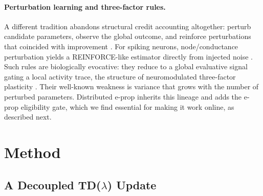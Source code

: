 \documentclass[10pt,twocolumn]{article}
\begin{document}
\paragraph{Perturbation learning and three-factor rules.}
A different tradition abandons structural credit accounting altogether:
perturb candidate parameters, observe the global outcome, and reinforce
perturbations that coincided with improvement
\citep{salimans2017evolutionstrategiesscalablealternative}. For spiking
neurons, node/conductance perturbation yields a REINFORCE-like estimator
directly from injected noise \citep{fiete2006gradient}. Such rules are
biologically evocative: they reduce to a global evaluative signal gating a
local activity trace, the structure of neuromodulated three-factor plasticity
\citep{Fremaux2016NeuromodulatedSTDP,Izhikevich2007DistalReward,
Florian2007RewardSTDP}. Their well-known weakness is variance that grows with
the number of perturbed parameters. Distributed e-prop inherits this lineage
and adds the e-prop eligibility gate, which we find essential for making it
work online, as described next.

\section{Method}
\label{sec:method}

\subsection{A Decoupled TD($\lambda$) Update}
\label{sec:tdlambda}
\end{document}
